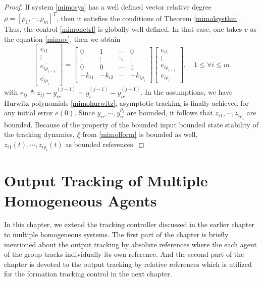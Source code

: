 \documentclass[11pt, a4paper, oneside, openany, reqno]{book}
\theoremstyle{definition}
\theoremstyle{remark}
\numberwithin{equation}{chapter} %
\begin{document}
\begin{proof}
	If system \eqref{mimosys} has a well defined vector relative degree 
	$ \rho=\left[ \rho_1, \cdots, \rho_m \right]^T $, 
	then it satisfies the conditions of Theorem \ref{mimolsysthm}. 
	Thus, the control \eqref{mimonctrl} is globally well defined.
	In that case, one takes $ v $ as the equation \eqref{mimov}, then we obtain
	\begin{equation}
	\left[\begin{array}{c}
	\dot{e_{i1}}\\
	\vdots\\
	\dot{e_{i\rho_{i-1}}}\\
	\dot{e_{i\rho_i}}\end{array}\right]=\left[\begin{array}{cccc}
	0 & 1 & \cdots & 0\\
	\vdots & \vdots & \ddots & \vdots\\
	0 & 0 & \cdots & 1\\
	-k_{i1} & -k_{i2} & \cdots & -k_{i\rho_i}\end{array}\right]\left[\begin{array}{c}
	e_{i1}\\
	\vdots\\
	e_{i\rho_{i-1}}\\
	e_{i\rho_i}\end{array}\right],
	\quad 1 \leq \forall i \leq m
	\end{equation}
	with $ e_{ij} \triangleq z_{ij} -y_{ir}^{(j-1)} = y_i^{(j-1)}-y_{ir}^{(j-1)} $. 
	In the assumptions, we have Hurwitz polynomials \eqref{mimohurwitz}, 
	asymptotic tracking is finally achieved for any initial error 
	$ e(0) $. Since $ y_{ir}, \cdots,y_{ir}^{\rho_i} $ are bounded, it follows that 
	$ z_{i1}, \cdots, z_{i\rho_i} $ are bounded. 
	Because of the property of the bounded input bounded state stability of the tracking dynamics, 
	$ \xi  $ from \eqref{mimolform} is bounded as well, $ z_{i1} (t), \cdots, z_{i\rho_i} (t) $
	as bounded references.
\end{proof}


\chapter{Output Tracking of Multiple Homogeneous Agents}
In this chapter, 
we extend the tracking controller discussed in the earlier chapter to multiple homogeneous systems.
The first part of the chapter is briefly mentioned about the output tracking by absolute references 
where the each agent of the group tracks individually its own reference.
And the second part of the chapter is devoted to the output tracking by relative references
which is utilized for the formation tracking control in the next chapter.
\end{document}
